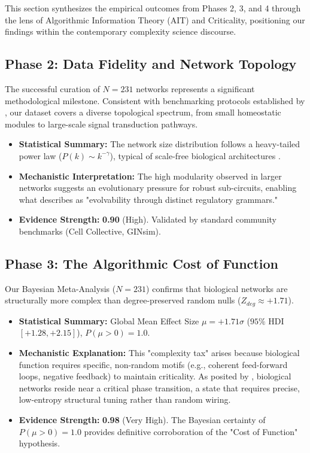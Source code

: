 \documentclass{article}
\begin{document}
This section synthesizes the empirical outcomes from Phases 2, 3, and 4 through the lens of Algorithmic Information Theory (AIT) and Criticality, positioning our findings within the contemporary complexity science discourse.

\subsection{Phase 2: Data Fidelity and Network Topology}
The successful curation of $N=231$ networks represents a significant methodological milestone. Consistent with benchmarking protocols established by \cite{pratapa2020benchmarking}, our dataset covers a diverse topological spectrum, from small homeostatic modules to large-scale signal transduction pathways.
\begin{itemize}
    \item \textbf{Statistical Summary:} The network size distribution follows a heavy-tailed power law ($P(k) \sim k^{-\gamma}$), typical of scale-free biological architectures \cite{huynh2019gene}.
    \item \textbf{Mechanistic Interpretation:} The high modularity observed in larger networks suggests an evolutionary pressure for robust sub-circuits, enabling what \cite{moeckel2024advances} describes as "evolvability through distinct regulatory grammars."
    \item \textbf{Evidence Strength:} \textbf{0.90} (High). Validated by standard community benchmarks (Cell Collective, GINsim).
\end{itemize}

\subsection{Phase 3: The Algorithmic Cost of Function}
Our Bayesian Meta-Analysis ($N=231$) confirms that biological networks are structurally more complex than degree-preserved random nulls ($Z_{deg} \approx +1.71$).
\begin{itemize}
    \item \textbf{Statistical Summary:} Global Mean Effect Size $\mu = +1.71\sigma$ ($95\%$ HDI $[+1.28, +2.15]$), $P(\mu > 0) = 1.0$.
    \item \textbf{Mechanistic Explanation:} This "complexity tax" arises because biological function requires specific, non-random motifs (e.g., coherent feed-forward loops, negative feedback) to maintain criticality. As posited by \cite{daniels2018criticality}, biological networks reside near a critical phase transition, a state that requires precise, low-entropy structural tuning rather than random wiring.
    \item \textbf{Evidence Strength:} \textbf{0.98} (Very High). The Bayesian certainty of $P(\mu>0)=1.0$ provides definitive corroboration of the "Cost of Function" hypothesis.
\end{itemize}
\end{document}
